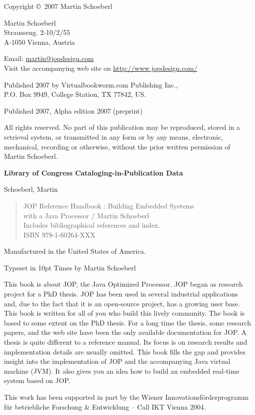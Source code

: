 \thispagestyle{empty}
\begin{flushleft}
{\small

Copyright \copyright \ 2007 Martin Schoeberl
\medskip

Martin Schoeberl\\
Strausseng. 2-10/2/55\\
A-1050 Vienna, Austria\\
\medskip

Email: \url{martin@jopdesign.com}\\
Visit the accompanying web site on \url{http://www.jopdesign.com/}
\medskip

Published 2007 by Virtualbookworm.com Publishing Inc.,\\
P.O. Box 9949, College Station, TX 77842, US.
\medskip

Published 2007, Alpha edition 2007 (preprint)
\medskip

All rights reserved. No part of this publication may be reproduced,
stored in a retrieval system, or transmitted in any form or by any
means, electronic, mechanical, recording or otherwise, without the
prior written permission of Martin Schoeberl.
\medskip


\textbf{Library of Congress Cataloging-in-Publication Data}
\medskip

Schoeberl, Martin
\begin{quote}
    JOP Reference Handbook : Building Embedded Systems\\
    with a Java Processor / Martin Schoeberl\\
    Includes bibliographical references and index.\\
    ISBN 978-1-60264-XXX
\end{quote}

\bigskip


Manufactured in the United States of America.

Typeset in 10pt Times by Martin Schoeberl }
\end{flushleft}



This book is about JOP, the Java Optimized Processor. JOP began as
research project for a PhD thesis. JOP has been used in several
industrial applications and, due to the fact that it is an
open-source project, has a growing user base. This book is written
for all of you who build this lively community. The book is based to
some extent on the PhD thesis. For a long time the thesis, some
research papers, and the web site  have been the only available
documentation for JOP. A thesis is quite different to a reference
manual. Its focus is on research results and implementation details
are usually omitted. This book fills the gap and provides insight
into the implementation of JOP and the accompanying Java virtual
machine (JVM). It also gives you an idea how to build an embedded
real-time system based on JOP.

This work has been supported in part by the Wiener
Innovationsf\"orderprogramm f\"ur betriebliche Forschung \&
Entwicklung -- Call IKT Vienna 2004.
